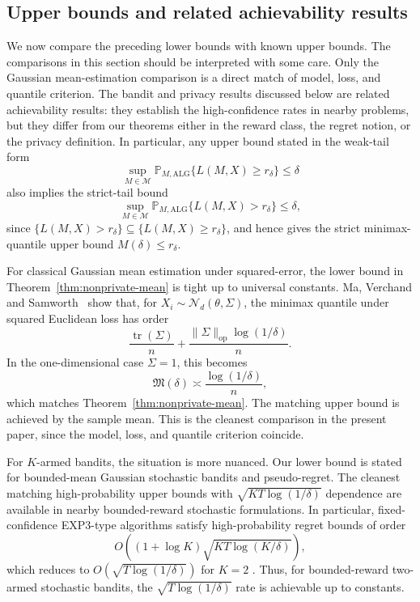 \documentclass[journal]{IEEEtran}
\begin{document}
\subsection{Upper bounds and related achievability results}
\label{sec:upper-bounds-comparison}

We now compare the preceding lower bounds with known upper bounds. The
comparisons in this section should be interpreted with some care. Only the
Gaussian mean-estimation comparison is a direct match of model, loss, and
quantile criterion. The bandit and privacy results discussed below are related
achievability results: they establish the high-confidence rates in
nearby problems, but they differ from our theorems either in the reward class, the
regret notion, or the privacy definition. In particular, any upper bound stated in the weak-tail form
\[
\sup_{M\in\mathcal M}\mathbb P_{M,\mathrm{ALG}}\{L(M,X)\ge r_\delta\}\le \delta
\]
also implies the strict-tail bound
\[
\sup_{M\in\mathcal M}\mathbb P_{M,\mathrm{ALG}}\{L(M,X)> r_\delta\}\le \delta,
\]
since \(\{L(M,X)>r_\delta\}\subseteq\{L(M,X)\ge r_\delta\}\), and hence gives the strict minimax-quantile upper bound \(M(\delta)\le r_\delta\).

For classical Gaussian mean estimation under squared-error, the lower bound in
Theorem~\ref{thm:nonprivate-mean} is tight up to universal constants. Ma,
Verchand and Samworth~\cite[Prop.~10]{ma2024high} show that, for
\(X_i\sim\mathcal N_d(\theta,\Sigma)\), the minimax quantile under squared
Euclidean loss has order
\[
\frac{\operatorname{tr}(\Sigma)}{n}
+
\frac{\|\Sigma\|_{\mathrm{op}}\log(1/\delta)}{n}.
\]
In the one-dimensional case \(\Sigma=1\), this becomes
\[
\mathfrak M(\delta)\asymp \frac{\log(1/\delta)}{n},
\]
which matches Theorem~\ref{thm:nonprivate-mean}. The matching upper bound is
achieved by the sample mean. This is the cleanest comparison in the present
paper, since the model, loss, and quantile criterion coincide.

For \(K\)-armed bandits, the situation is more nuanced. Our lower bound is stated
for bounded-mean Gaussian stochastic bandits and pseudo-regret. The cleanest
matching high-probability upper bounds with
\(\sqrt{KT\log(1/\delta)}\) dependence are available in nearby bounded-reward
stochastic formulations. In particular, fixed-confidence EXP3-type algorithms
satisfy high-probability regret bounds of order
\[
O\!\left((1+\log K)\sqrt{KT\log(K/\delta)}\right),
\]
which reduces to \(O(\sqrt{T\log(1/\delta)})\) for \(K=2\)
\cite{seldin2013evaluation}. Thus, for bounded-reward two-armed stochastic
bandits, the \(\sqrt{T\log(1/\delta)}\) rate is achievable up to constants.
\end{document}
